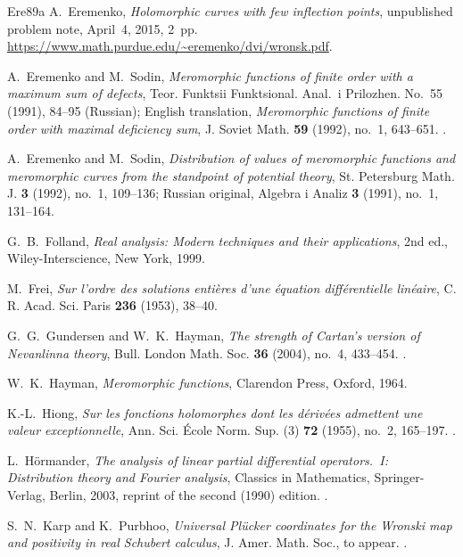\documentclass[11pt,letterpaper,reqno]{amsart}
\theoremstyle{remark}
\numberwithin{equation}{section}
\begin{document}
\begin{thebibliography}{Ere89a}
A.~Eremenko,
\emph{Holomorphic curves with few inflection points},
unpublished problem note, April~4, 2015, 2~pp.
\url{https://www.math.purdue.edu/~eremenko/dvi/wronsk.pdf}.

A.~Eremenko and M.~Sodin,
\emph{Meromorphic functions of finite order with a maximum sum of defects},
Teor. Funktsii Funktsional. Anal.\ i Prilozhen. No.~55 (1991), 84--95
(Russian); English translation, \emph{Meromorphic functions of finite
order with maximal deficiency sum}, J. Soviet Math. \textbf{59} (1992),
no.~1, 643--651.
.

A.~Eremenko and M.~Sodin,
\emph{Distribution of values of meromorphic functions and meromorphic
curves from the standpoint of potential theory},
St. Petersburg Math. J. \textbf{3} (1992), no.~1, 109--136;
Russian original, Algebra i Analiz \textbf{3} (1991), no.~1, 131--164.

G.~B.~Folland,
\emph{Real analysis: Modern techniques and their applications},
2nd ed., Wiley-Interscience, New York, 1999.

M.~Frei,
\emph{Sur l'ordre des solutions enti\`eres d'une \'equation diff\'erentielle
lin\'eaire},
C. R. Acad. Sci. Paris \textbf{236} (1953), 38--40.

G.~G.~Gundersen and W.~K.~Hayman,
\emph{The strength of Cartan's version of Nevanlinna theory},
Bull. London Math. Soc. \textbf{36} (2004), no.~4, 433--454.
.

W.~K.~Hayman,
\emph{Meromorphic functions},
Clarendon Press, Oxford, 1964.

K.-L.~Hiong,
\emph{Sur les fonctions holomorphes dont les d\'eriv\'ees admettent
une valeur exceptionnelle},
Ann. Sci. \'Ecole Norm. Sup. (3) \textbf{72} (1955), no.~2, 165--197.
.

L.~H\"ormander,
\emph{The analysis of linear partial differential operators.~I:
Distribution theory and Fourier analysis},
Classics in Mathematics, Springer-Verlag, Berlin, 2003,
reprint of the second (1990) edition.
.

S.~N.~Karp and K.~Purbhoo,
\emph{Universal Pl\"ucker coordinates for the Wronski map and positivity
in real Schubert calculus},
J. Amer. Math. Soc., to appear.
.



\end{thebibliography}
\end{document}
